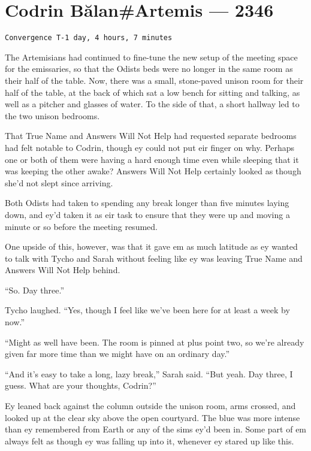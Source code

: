 \hypertarget{codrin-bux103lanartemis-2346}{%
\chapter{Codrin Bălan\#Artemis — 2346}\label{codrin-bux103lanartemis-2346}}

\begin{verbatim}
Convergence T-1 day, 4 hours, 7 minutes
\end{verbatim}

The Artemisians had continued to fine-tune the new setup of the meeting space for the emissaries, so that the Odists beds were no longer in the same room as their half of the table. Now, there was a small, stone-paved unison room for their half of the table, at the back of which sat a low bench for sitting and talking, as well as a pitcher and glasses of water. To the side of that, a short hallway led to the two unison bedrooms.

That True Name and Answers Will Not Help had requested separate bedrooms had felt notable to Codrin, though ey could not put eir finger on why. Perhaps one or both of them were having a hard enough time even while sleeping that it was keeping the other awake? Answers Will Not Help certainly looked as though she'd not slept since arriving.

Both Odists had taken to spending any break longer than five minutes laying down, and ey'd taken it as eir task to ensure that they were up and moving a minute or so before the meeting resumed.

One upside of this, however, was that it gave em as much latitude as ey wanted to talk with Tycho and Sarah without feeling like ey was leaving True Name and Answers Will Not Help behind.

``So. Day three.''

Tycho laughed. ``Yes, though I feel like we've been here for at least a week by now.''

``Might as well have been. The room is pinned at plus point two, so we're already given far more time than we might have on an ordinary day.''

``And it's easy to take a long, lazy break,'' Sarah said. ``But yeah. Day three, I guess. What are your thoughts, Codrin?''

Ey leaned back against the column outside the unison room, arms crossed, and looked up at the clear sky above the open courtyard. The blue was more intense than ey remembered from Earth or any of the sims ey'd been in. Some part of em always felt as though ey was falling up into it, whenever ey stared up like this.

